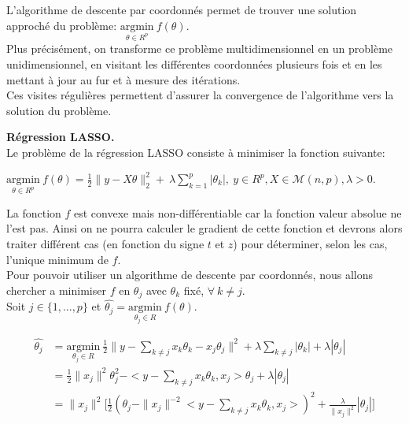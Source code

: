 \documentclass{article}
\begin{document}
L'algorithme de descente par coordonnés permet de trouver une solution approché du problème: $\underset{\theta\in R^p}{\mathrm{argmin}} \ f(\theta).$  \\

Plus précisément, on transforme ce problème multidimensionnel en un problème unidimensionnel, en visitant les différentes coordonnées plusieurs fois et en les mettant à jour au fur et à mesure des itérations.\\
Ces visites régulières permettent d'assurer la convergence de l'algorithme vers la solution du problème.

\newpage 

\textbf{Régression LASSO.} \\

Le problème de la régression LASSO consiste à minimiser la fonction suivante: 

\begin{center}
$\underset{\theta\in R^p}{\mathrm{argmin}} \ f(\theta)=\frac{1}{2} {\| y - X\theta\|_2^2} + \ \lambda \sum_{k=1}^{p} |\theta_k|
, \ y \in R^p,X \in \mathcal{M}(n,p),\lambda > 0.
 $
\end{center}

La fonction $f$ est convexe mais non-différentiable car la fonction valeur absolue ne l'est pas.
Ainsi on ne pourra calculer le gradient de cette fonction et devrons alors traiter différent cas (en fonction du signe $t$ et $z$) pour déterminer, selon les cas, l'unique minimum de $f$.\\

Pour pouvoir utiliser un algorithme de descente par coordonnés, nous allons chercher a minimiser $f$ en $\theta_j$ avec $\theta_k$ fixé, $\forall\ k \ne j$.\\

Soit $j \in \{1, ... ,p \}$ et $ \hat{\theta_j} = \underset{\theta_j\in R}{\mathrm{argmin}} \ f(\theta).  $ 

\begin{align*}
\hat{\theta_j} &= \underset{\theta_j\in R}{\mathrm{argmin}}     \ \frac{1}{2} \|y - \sum_{k \ne j} x_k\theta_k  - x_j\theta_j\|^2 + \lambda \sum_{k \ne j}|\theta_k| + \lambda|\theta_j| \\ &= 
\frac{1}{2} \|x_j\|^2\theta_j^2 - <y - \sum_{k \ne j} x_k\theta_k,x_j>\theta_j + \lambda|\theta_j| \\ &=
\|x_j\|^2 \big[\frac{1}{2}(\theta_j - \|x_j\|^{-2}<y - \sum_{k \ne j} x_k\theta_k,x_j>)^2 + \frac{\lambda}{\|x_j\|^2}|\theta_j|]
\end{align*}
\end{document}
